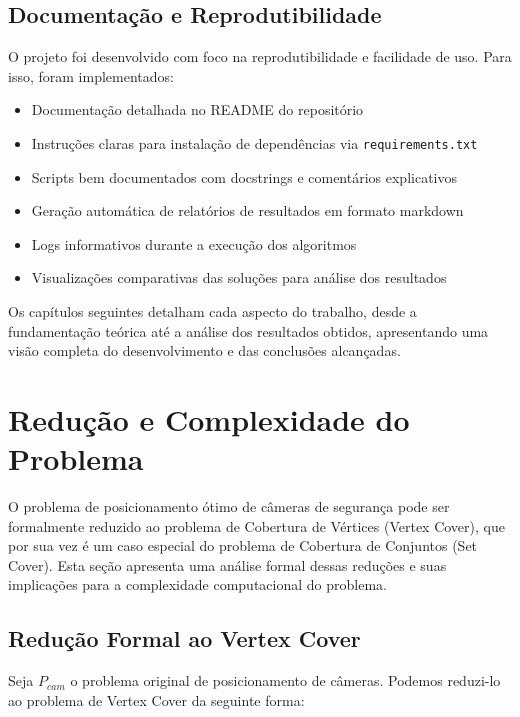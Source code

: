 \documentclass[12pt, a4paper]{report}
\begin{document}
\subsection{Documentação e Reprodutibilidade}
O projeto foi desenvolvido com foco na reprodutibilidade e facilidade de uso. Para isso, foram implementados:

\begin{itemize}
    \item Documentação detalhada no README do repositório
    \item Instruções claras para instalação de dependências via \texttt{requirements.txt}
    \item Scripts bem documentados com docstrings e comentários explicativos
    \item Geração automática de relatórios de resultados em formato markdown
    \item Logs informativos durante a execução dos algoritmos
    \item Visualizações comparativas das soluções para análise dos resultados
\end{itemize}

Os capítulos seguintes detalham cada aspecto do trabalho, desde a fundamentação teórica até a análise dos resultados obtidos, apresentando uma visão completa do desenvolvimento e das conclusões alcançadas.

\section{Redução e Complexidade do Problema}

O problema de posicionamento ótimo de câmeras de segurança pode ser formalmente reduzido ao problema de Cobertura de Vértices (Vertex Cover), que por sua vez é um caso especial do problema de Cobertura de Conjuntos (Set Cover). Esta seção apresenta uma análise formal dessas reduções e suas implicações para a complexidade computacional do problema.

\subsection{Redução Formal ao Vertex Cover}
Seja $P_{cam}$ o problema original de posicionamento de câmeras. Podemos reduzi-lo ao problema de Vertex Cover da seguinte forma:
\end{document}
